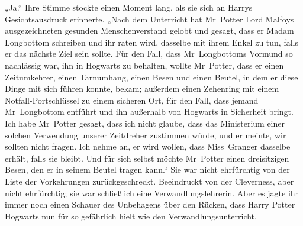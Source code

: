 „Ja.“ Ihre Stimme stockte einen Moment lang, als sie sich an Harrys Gesichtsausdruck erinnerte. „Nach dem Unterricht hat Mr~Potter Lord Malfoys ausgezeichneten gesunden Menschenverstand gelobt und gesagt, dass er Madam Longbottom schreiben und ihr raten wird, dasselbe mit ihrem Enkel zu tun, falls er das nächste Ziel sein sollte. Für den Fall, dass Mr~Longbottoms Vormund so nachlässig war, ihn in Hogwarts zu behalten, wollte Mr~Potter, dass er einen Zeitumkehrer, einen Tarnumhang, einen Besen und einen Beutel, in dem er diese Dinge mit sich führen konnte, bekam; außerdem einen Zehenring mit einem Notfall-Portschlüssel zu einem sicheren Ort, für den Fall, dass jemand Mr~Longbottom entführt und ihn außerhalb von Hogwarts in Sicherheit bringt. Ich habe Mr~Potter gesagt, dass ich nicht glaube, dass das Ministerium einer solchen Verwendung unserer Zeitdreher zustimmen würde, und er meinte, wir sollten nicht fragen. Ich nehme an, er wird wollen, dass Miss~Granger dasselbe erhält, falls sie bleibt. Und für sich selbst möchte Mr~Potter einen dreisitzigen Besen, den er in seinem Beutel tragen kann.“
Sie war nicht ehrfürchtig von der Liste der Vorkehrungen zurückgeschreckt. Beeindruckt von der Cleverness, aber nicht ehrfürchtig; sie war schließlich eine Verwandlungslehrerin. Aber es jagte ihr immer noch einen Schauer des Unbehagens über den Rücken, dass Harry Potter Hogwarts nun für so gefährlich hielt wie den Verwandlungsunterricht.

